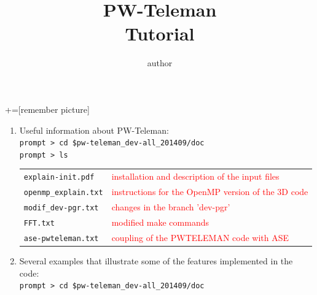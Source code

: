 \documentclass[10pt]{beamer}
\title%
{PW-Teleman\\
Tutorial }
\author[shortname]{author
 }
\institute[shortinst]{institute}
\begin{document}
+=[remember picture]

\begin{frame}
\titlepage{}
\end{frame}

\begin{frame}
\begin{enumerate}
\item Useful information about PW-Teleman:\\
\vspace*{0.2cm}
{\tt prompt > cd \$pw-teleman\_dev-all\_201409/doc}\\
\vspace*{0.2cm}
{\tt prompt > ls}\\
\vspace*{0.4cm}

\begin{tabular}{ll}
\vspace*{0.2cm}
{\tt explain-init.pdf}& \footnotesize{\textcolor{red}{installation and description of the input files}}\\
\vspace*{0.2cm}
{\tt openmp\_explain.txt} & \footnotesize{\textcolor{red}{instructions for the OpenMP version of the 3D code}}\\
\vspace*{0.2cm}
{\tt modif\_dev-pgr.txt} &\footnotesize{\textcolor{red}{changes in the branch 'dev-pgr'}}\\
\vspace*{0.2cm}
{\tt FFT.txt} & \footnotesize{\textcolor{red}{modified make commands}}\\
\vspace*{0.2cm}
{\tt ase-pwteleman.txt} & \footnotesize{\textcolor{red}{coupling of the PWTELEMAN code with ASE}}\\
\end{tabular}
\vspace*{0.2cm}
\item Several examples that illustrate some of the features implemented in the code:\\
\vspace*{0.2cm}
{\tt prompt > cd \$pw-teleman\_dev-all\_201409/doc}
\end{enumerate}
\end{frame}

\end{document}
